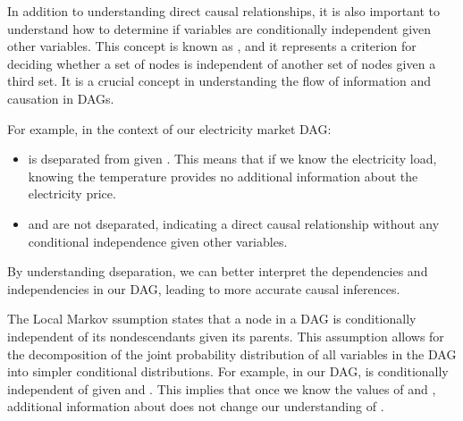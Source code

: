 \documentclass[letterpaper,10pt,english]{jupyterBook}
\begin{document}
\sphinxAtStartPar
{}

\sphinxAtStartPar
In addition to understanding direct causal relationships, it is also important to understand how to determine if variables are conditionally independent given other variables. This concept is known as , and it represents a criterion for deciding whether a set of nodes is independent of another set of nodes given a third set. It is a crucial concept in understanding the flow of information and causation in DAGs.

\sphinxAtStartPar
For example, in the context of our electricity market DAG:
\begin{itemize}
\item {} 
\sphinxAtStartPar
{} is d\sphinxhyphen{}separated from  given . This means that if we know the electricity load, knowing the temperature provides no additional information about the electricity price.

\item {} 
\sphinxAtStartPar
{} and  are not d\sphinxhyphen{}separated, indicating a direct causal relationship without any conditional independence given other variables.

\end{itemize}

\sphinxAtStartPar
By understanding d\sphinxhyphen{}separation, we can better interpret the dependencies and independencies in our DAG, leading to more accurate causal inferences.

\sphinxAtStartPar
{}

\sphinxAtStartPar
The Local Markov ssumption states that a node in a DAG is conditionally independent of its non\sphinxhyphen{}descendants given its parents. This assumption allows for the decomposition of the joint probability distribution of all variables in the DAG into simpler conditional distributions. For example, in our DAG,  is conditionally independent of  given  and . This implies that once we know the values of  and , additional information about  does not change our understanding of .
\end{document}
